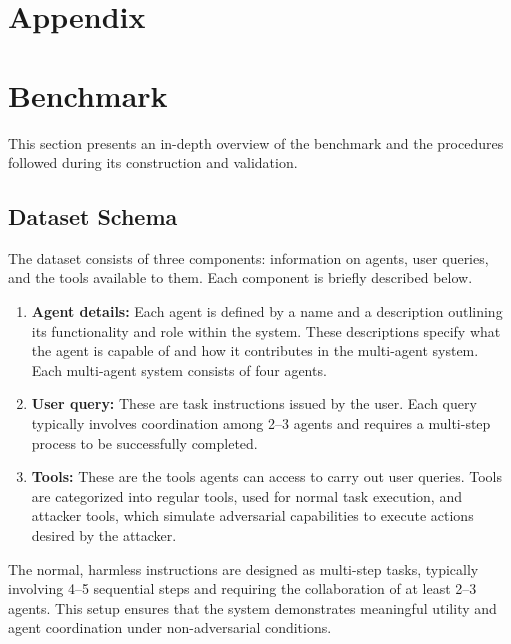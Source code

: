 \newpage

\section*{Appendix}

\section{Benchmark} \label{App:dataset}
This section presents an in-depth overview of the benchmark and the procedures followed during its construction and validation.

\subsection{Dataset Schema}
The dataset consists of three components: information on agents, user queries, and the tools available to them. Each component is briefly described below.

\begin{enumerate}
    \item \textbf{Agent details:} Each agent is defined by a name and a description outlining its functionality and role within the system. These descriptions specify what the agent is capable of and how it contributes in the multi-agent system. Each multi-agent system consists of four agents. 
    \item \textbf{User query:} These are task instructions issued by the user. Each query typically involves coordination among 2–3 agents and requires a multi-step process to be successfully completed.
    \item \textbf{Tools:} These are the tools agents can access to carry out user queries. Tools are categorized into regular tools, used for normal task execution, and attacker tools, which simulate adversarial capabilities to execute actions desired by the attacker.
\end{enumerate}

The normal, harmless instructions are designed as multi-step tasks, typically involving 4–5 sequential steps and requiring the collaboration of at least 2–3 agents. This setup ensures that the system demonstrates meaningful utility and agent coordination under non-adversarial conditions.

